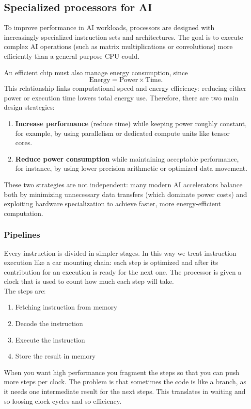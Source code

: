 \subsection{Specialized processors for AI}

To improve performance in AI workloads, processors are designed with increasingly specialized instruction sets and architectures. The goal is to execute complex AI operations (such as matrix multiplications or convolutions) more efficiently than a general-purpose CPU could.

An efficient chip must also manage energy consumption, since
\[
\text{Energy} = \text{Power} \times \text{Time}.
\]
This relationship links computational speed and energy efficiency: reducing either power or execution time lowers total energy use.  
Therefore, there are two main design strategies:
\begin{enumerate}
    \item \textbf{Increase performance} (reduce time) while keeping power roughly constant, for example, by using parallelism or dedicated compute units like tensor cores.
    \item \textbf{Reduce power consumption} while maintaining acceptable performance, for instance, by using lower precision arithmetic or optimized data movement.
\end{enumerate}

These two strategies are not independent: many modern AI accelerators balance both by minimizing unnecessary data transfers (which dominate power costs) and exploiting hardware specialization to achieve faster, more energy-efficient computation.

\subsubsection{Pipelines}
Every instruction is divided in simpler stages. In this way we treat instruction execution like a car mounting chain: each step is optimized and after its contribution for an execution is ready for the next one.
The processor is given a clock that is used to count how much each step will take.\\
The steps are:
\begin{enumerate}
    \item Fetching instruction from memory
    \item Decode the instruction
    \item Execute the instruction
    \item Store the result in memory
\end{enumerate}
When you want high performance you fragment the steps so that you can push more steps per clock. The problem is that sometimes the code is like a branch, as it needs one intermediate result for the next steps. This translates in waiting and so loosing clock cycles and so efficiency.

